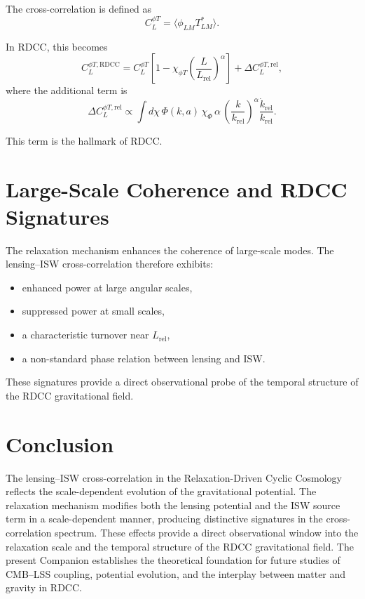 \documentclass[11pt,a4paper]{article}
\begin{document}
The cross-correlation is defined as
\begin{equation}
    C_{L}^{\phi T}
    = \langle \phi_{LM} T^{*}_{LM} \rangle.
\end{equation}

In RDCC, this becomes
\begin{equation}
    C_{L}^{\phi T,\mathrm{RDCC}}
    = C_{L}^{\phi T}
      \left[
        1 - \chi_{\phi T}
        \left(\frac{L}{L_{\mathrm{rel}}}\right)^{\alpha}
      \right]
      + \Delta C_{L}^{\phi T,\mathrm{rel}},
\end{equation}
where the additional term is
\begin{equation}
    \Delta C_{L}^{\phi T,\mathrm{rel}}
    \propto
    \int d\chi\,
    \Phi(k,a)\,
    \chi_{\Phi}\,\alpha\,
    \left(\frac{k}{k_{\mathrm{rel}}}\right)^{\alpha}
    \frac{\dot{k}_{\mathrm{rel}}}{k_{\mathrm{rel}}}.
\end{equation}

This term is the hallmark of RDCC.
\section{Large-Scale Coherence and RDCC Signatures}

The relaxation mechanism enhances the coherence of large-scale modes. The 
lensing--ISW cross-correlation therefore exhibits:

\begin{itemize}
    \item enhanced power at large angular scales,
    \item suppressed power at small scales,
    \item a characteristic turnover near $L_{\mathrm{rel}}$,
    \item a non-standard phase relation between lensing and ISW.
\end{itemize}

These signatures provide a direct observational probe of the temporal structure of 
the RDCC gravitational field.
\section{Conclusion}

The lensing--ISW cross-correlation in the Relaxation-Driven Cyclic Cosmology 
reflects the scale-dependent evolution of the gravitational potential. The 
relaxation mechanism modifies both the lensing potential and the ISW source term in 
a scale-dependent manner, producing distinctive signatures in the cross-correlation 
spectrum. These effects provide a direct observational window into the relaxation 
scale and the temporal structure of the RDCC gravitational field. The present 
Companion establishes the theoretical foundation for future studies of CMB--LSS 
coupling, potential evolution, and the interplay between matter and gravity in 
RDCC.


\nocite{*}

\end{document}
